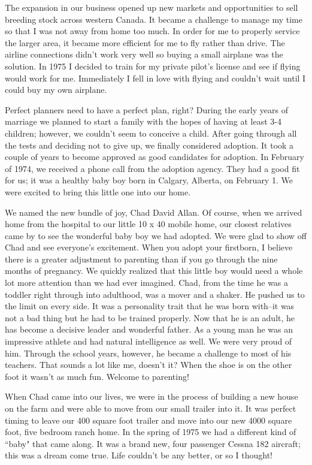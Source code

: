 \documentclass[oneside]{book}
\begin{document}
The expansion in our business opened up new markets and opportunities to sell breeding stock across western Canada. It became a challenge to manage my time so that I was not away from home too much. In order for me to properly service the larger area, it became more efficient for me to fly rather than drive. The airline connections didn't work very well so buying a small airplane was the solution. In 1975 I decided to train for my private pilot's license and see if flying would work for me. Immediately I fell in love with flying and couldn't wait until I could buy my own airplane.

Perfect planners need to have a perfect plan, right? During the early years of marriage we planned to start a family with the hopes of having at least 3-4 children; however, we couldn't seem to conceive a child. After going through all the tests and deciding not to give up, we finally considered adoption. It took a couple of years to become approved as good candidates for adoption. In February of 1974, we received a phone call from the adoption agency. They had a good fit for us; it was a healthy baby boy born in Calgary, Alberta, on February 1. We were excited to bring this little one into our home.

We named the new bundle of joy, Chad David Allan. Of course, when we arrived home from the hospital to our little 10 x 40 mobile home, our closest relatives came by to see the wonderful baby boy we had adopted. We were glad to show off Chad and see everyone's excitement. When you adopt your firstborn, I believe there is a greater adjustment to parenting than if you go through the nine months of pregnancy. We quickly realized that this little boy would need a whole lot more attention than we had ever imagined. Chad, from the time he was a toddler right through into adulthood, was a mover and a shaker. He pushed us to the limit on every side. It was a personality trait that he was born with--it was not a bad thing but he had to be trained properly. Now that he is an adult, he has become a decisive leader and wonderful father. As a young man he was an impressive athlete and had natural intelligence as well. We were very proud of him. Through the school years, however, he became a challenge to most of his teachers. That sounds a lot like me, doesn't it?  When the shoe is on the other foot it wasn't as much fun. Welcome to parenting! 

When Chad came into our lives, we were in the process of building a new house on the farm and were able to move from our small trailer into it. It was perfect timing to leave our 400 square foot trailer and move into our new 4000 square foot, five bedroom ranch home. In the spring of 1975 we had a different kind of ``baby" that came along. It was a brand new, four passenger Cessna 182 aircraft; this was a dream come true. Life couldn't be any better, or so I thought!
\end{document}
